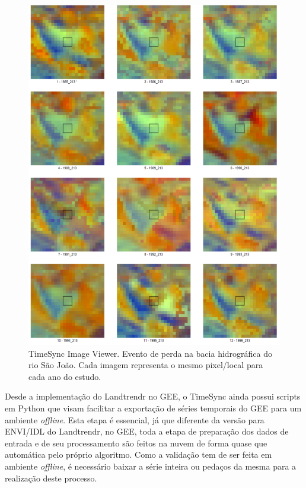 \begin{figure}[H]
    \centering
    \includegraphics[scale=.5]{images/loss_22_bhrsj_imgs.pdf}
    \caption{TimeSync Image Viewer. Evento de perda na bacia hidrográfica do rio São João. Cada imagem representa o mesmo pixel/local para cada ano do estudo.}
    \label{fig:loss_22_bhrsj_imgs}
\end{figure}

Desde a implementação do Landtrendr no GEE, o TimeSync ainda possui scripts em Python que visam facilitar a exportação de séries temporais do GEE para um ambiente \textit{offline}. Esta etapa é essencial, já que diferente da versão para ENVI/IDL do Landtrendr, no GEE, toda a etapa de preparação dos dados de entrada e de seu processamento são feitos na nuvem de forma quase que automática pelo próprio algoritmo. Como a validação tem de ser feita em ambiente \textit{offline}, é necessário baixar a série inteira ou pedaços da mesma para a realização deste processo. 

